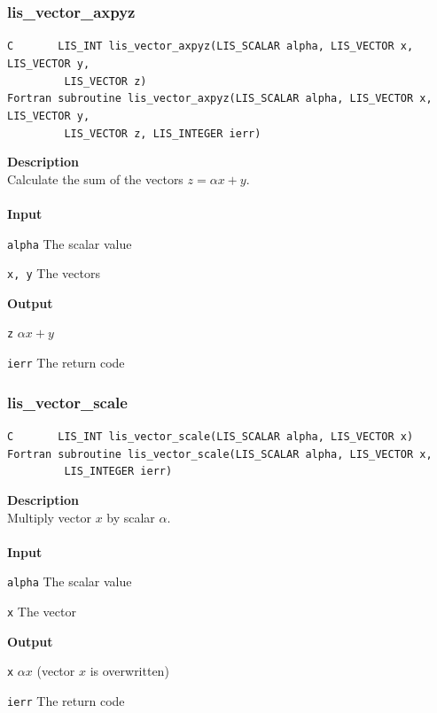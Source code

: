 \documentclass[a4paper]{article}
\newcommand{\namelistlabel}[1]{\mbox{#1}\hfill}
\newenvironment{namelist}[1]{%
\begin{list}{}
  {\let\makelabel\namelistlabel
  \settowidth{\labelwidth}{#1}
  \setlength{\leftmargin}{1.1\labelwidth}}
  }{%
\end{list}}
\begin{document}
\newpage
\subsubsection{lis\_vector\_axpyz}
\begin{screen}
\verb|C       LIS_INT lis_vector_axpyz(LIS_SCALAR alpha, LIS_VECTOR x, LIS_VECTOR y,|\\
\verb|         LIS_VECTOR z)|\\
\verb|Fortran subroutine lis_vector_axpyz(LIS_SCALAR alpha, LIS_VECTOR x, LIS_VECTOR y,|\\
\verb|         LIS_VECTOR z, LIS_INTEGER ierr)|
\end{screen}
{\bf Description}\\
\indent
Calculate the sum of the vectors $z = \alpha x + y$.
\\ \\
\noindent
{\bf Input}
\begin{namelist}{XXXXXXXXXXXXXXXXXXXX}
\item[\tt alpha] The scalar value
\item[\tt x, y] The vectors
\end{namelist}
{\bf Output}
\begin{namelist}{XXXXXXXXXXXXXXXXXXXX}
\item[\tt z] $\alpha x + y$
\item[\tt ierr] The return code
\end{namelist}

\subsubsection{lis\_vector\_scale}
\begin{screen}
\verb|C       LIS_INT lis_vector_scale(LIS_SCALAR alpha, LIS_VECTOR x)|
\verb|Fortran subroutine lis_vector_scale(LIS_SCALAR alpha, LIS_VECTOR x,|\\
\verb|         LIS_INTEGER ierr)|
\end{screen}
{\bf Description}\\
\indent
Multiply vector $x$ by scalar $\alpha$.
\\ \\
\noindent
{\bf Input}
\begin{namelist}{XXXXXXXXXXXXXXXXXXXX}
\item[\tt alpha] The scalar value
\item[\tt x] The vector
\end{namelist}
{\bf Output}
\begin{namelist}{XXXXXXXXXXXXXXXXXXXX}
\item[\tt x] $\alpha x$ (vector $x$ is overwritten)
\item[\tt ierr] The return code
\end{namelist}
\end{document}
